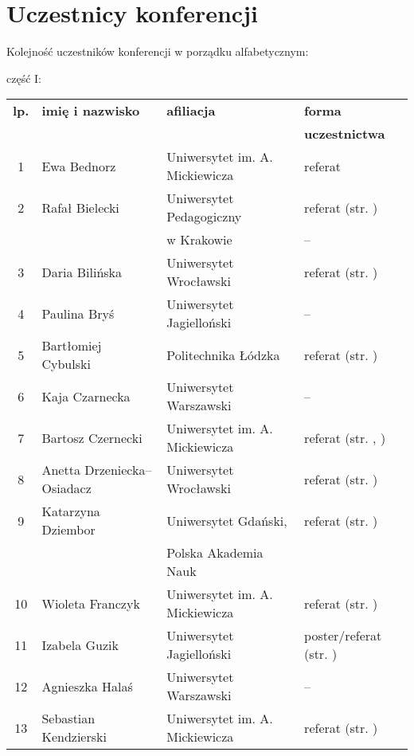 \documentclass[12pt,oneside]{book}
\begin{document}
\chapter{Uczestnicy konferencji}

Kolejność uczestników konferencji w porządku alfabetycznym:

\vspace{1cm}

\Large część I:

\normalsize
\begin{tabular}{||c|l|l|l||}
\hline
\hline
\textbf{lp.} & \textbf{imię i nazwisko} & \textbf{afiliacja} & \textbf{forma}\\
 &  &  & \textbf{uczestnictwa}\\
\hline
\hline
\hline
1	 & Ewa Bednorz & Uniwersytet im. A. Mickiewicza & referat \\\hline
2	 & Rafał Bielecki & Uniwersytet Pedagogiczny & referat (str. \pageref{bielecki})\\
	 &  & w Krakowie & -- \\\hline
3	 & Daria Bilińska & Uniwersytet Wrocławski & referat (str. \pageref{bilinska}) \\\hline
4	 & Paulina Bryś & Uniwersytet Jagielloński & -- \\\hline
5	 & Bartłomiej Cybulski & Politechnika Łódzka & referat (str. \pageref{cybulski}) \\\hline
6	 & Kaja Czarnecka & Uniwersytet Warszawski & -- \\\hline
7	 & Bartosz Czernecki & Uniwersytet im. A. Mickiewicza & referat (str. \pageref{kolendowicz}, \pageref{taszarek}) \\\hline
8	 & Anetta Drzeniecka--Osiadacz & Uniwersytet Wrocławski & referat (str. \pageref{bilinska}) \\\hline
9 	 & Katarzyna Dziembor & Uniwersytet Gdański, & referat (str. \pageref{dziembor})\\
		 &  & Polska Akademia Nauk &  \\\hline
10	 & Wioleta Franczyk & Uniwersytet im. A. Mickiewicza & referat  (str. \pageref{franczyk})\\\hline
11	 & Izabela Guzik & Uniwersytet Jagielloński & poster/referat (str. \pageref{guzik})\\\hline	
 12	 & Agnieszka Halaś & Uniwersytet Warszawski & -- \\\hline	
 13 & Sebastian Kendzierski & Uniwersytet im. A. Mickiewicza & referat (str. \pageref{kendzierski}) \\\hline

\end{tabular}
\end{document}
